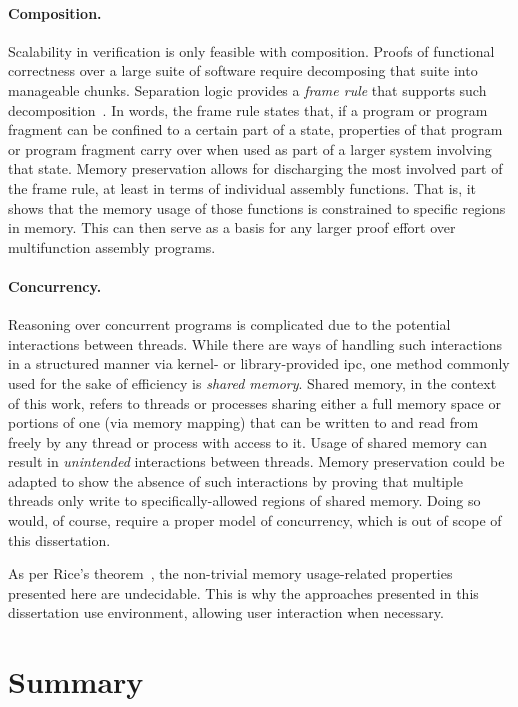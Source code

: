 \paragraph{Composition.}\label{sse:composition}
Scalability in verification is only feasible with composition.
Proofs of functional correctness over a large suite of software
require decomposing that suite into manageable chunks.
Separation logic provides a \emph{frame rule} that supports such%
%
decomposition~\citep{o2001local,reynolds2002separation,krebbers2017essence}.
In words, the frame rule states that,
if a program or program fragment can be confined to a certain part of a state,
properties of that program or program fragment carry over
when used as part of a larger system involving that state.
Memory preservation allows for discharging the most involved part of the frame rule,
at least in terms of individual assembly functions.
That is, it shows that the memory usage of those functions is constrained
to specific regions in memory.
This can then serve as a basis
for any larger proof effort over multifunction assembly programs.

\paragraph{Concurrency.}
Reasoning over concurrent programs is complicated
due to the potential interactions between threads.
While there are ways of handling such interactions in a structured manner
via kernel- or library-provided \ac{ipc},
one method commonly used for the sake of efficiency is \emph{shared memory}.
Shared memory, in the context of this work,
refers to threads or processes sharing either a full memory space
or portions of one (via memory mapping)
that can be written to and read from freely by any thread or process with access to it.
Usage of shared memory can result in \emph{unintended} interactions between threads.
Memory preservation could be adapted to show the absence of such interactions
by proving that multiple threads only write
to specifically-allowed regions of shared memory.
Doing so would, of course, require a proper model of concurrency,
which is out of scope of this dissertation.










As per Rice's theorem~\citep{rice1953classes},
the non-trivial memory usage-related properties presented here are undecidable.
This is why the approaches presented in this dissertation
use  environment, allowing user interaction when necessary.


\section{Summary}
